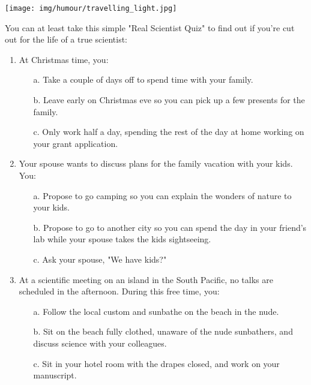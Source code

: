 	\begin{center}\underline{\hspace{5 cm}}\end{center}
		\begin{center}
		\texttt{[image: img/humour/travelling\_light.jpg]}	
	\end{center}

\pagebreak
You can at least take this simple "Real Scientist Quiz" to find out if you're cut out for the life of a true scientist:
\begin{enumerate}
	\item At Christmas time, you: 
	\begin{enumerate}
		\item[a.] Take a couple of days off to spend time with your family.
		\item[b.] Leave early on Christmas eve so you can pick up a few presents for the family. 
		\item[c.] Only work half a day, spending the rest of the day at home working on your grant application.
	\end{enumerate}

	\item Your spouse wants to discuss plans for the family vacation with your kids. You: 
	\begin{enumerate}
		\item[a.] Propose to go camping so you can explain the wonders of nature to your kids.
		\item[b.] Propose to go to another city so you can spend the day in your friend's lab while your spouse takes the kids sightseeing.
		\item[c.] Ask your spouse, "We have kids?"
	\end{enumerate}

	\item At a scientific meeting on an island in the South Pacific, no talks are scheduled in the afternoon. During this free time, you: 
	\begin{enumerate}
		\item[a.] Follow the local custom and sunbathe on the beach in the nude.
		\item[b.] Sit on the beach fully clothed, unaware of the nude sunbathers, and discuss science with your colleagues.
		\item[c.] Sit in your hotel room with the drapes closed, and work on your manuscript.
	\end{enumerate}


\end{enumerate}
